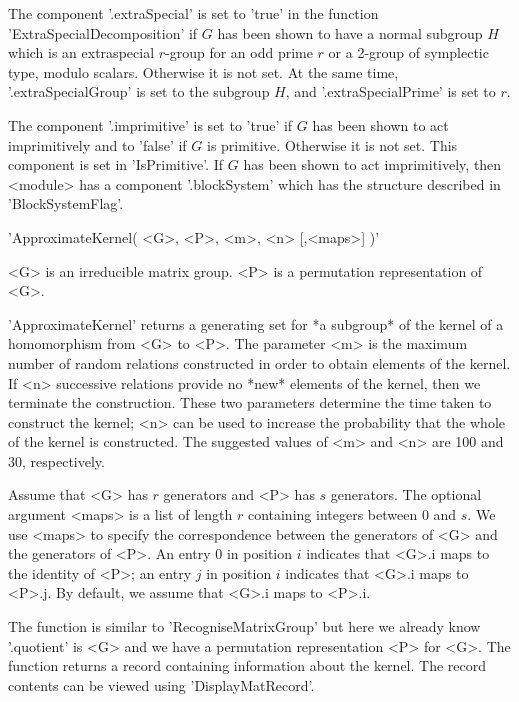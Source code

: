 The  component  '.extraSpecial' is set     to  'true' in  the    function
'ExtraSpecialDecomposition'  if  $G$ has  been shown   to  have a  normal
subgroup $H$ which is an extraspecial $r$-group for an odd prime $r$ or a
2-group of symplectic type, modulo scalars.  Otherwise it is not set.  At
the same  time,  '.extraSpecialGroup' is  set  to the subgroup  $H$,  and
'.extraSpecialPrime' is set to $r$.

The component '.imprimitive'  is set to 'true' if  $G$ has  been shown to
act imprimitively and  to 'false' if $G$ is  primitive.   Otherwise it is
not set.  This component is set in 'IsPrimitive'.   If $G$ has been shown
to act imprimitively, then <module> has  a component '.blockSystem' which
has the structure described in 'BlockSystemFlag'.


'ApproximateKernel( <G>, <P>, <m>, <n> [,<maps>] )'

<G> is an  irreducible matrix group. <P>  is a permutation representation
of <G>.

'ApproximateKernel'  returns a  generating set for  *a  subgroup* of  the
kernel  of  a homomorphism from  <G>  to <P>.  The   parameter <m> is the
maximum   number  of random relations  constructed    in order to  obtain
elements of   the kernel.  If  <n> successive  relations provide no *new*
elements of the kernel,  then we terminate  the construction.   These two
parameters determine  the time taken to  construct the kernel; <n> can be
used to  increase the   probability that the    whole  of the   kernel is
constructed.  The suggested  values of   <m> and <n>   are  100 and   30,
respectively.

Assume  that  <G> has $r$  generators  and  <P> has  $s$ generators.  The
optional argument <maps>  is  a list of   length $r$ containing  integers
between $0$ and $s$. We use  <maps> to specify the correspondence between
the generators of <G> and the generators of <P>. An entry $0$ in position
$i$ indicates that <G>.i maps  to the identity of   <P>; an entry $j$  in
position $i$ indicates that  <G>.i maps  to <P>.j. By default,  we assume
that <G>.i maps to <P>.i.

The  function is similar  to  'RecogniseMatrixGroup' but here we  already
know '.quotient' is <G> and we  have a permutation representation <P> for
<G>. The  function  returns a  record  containing information  about  the
kernel.  The record contents can be viewed using 'DisplayMatRecord'.

